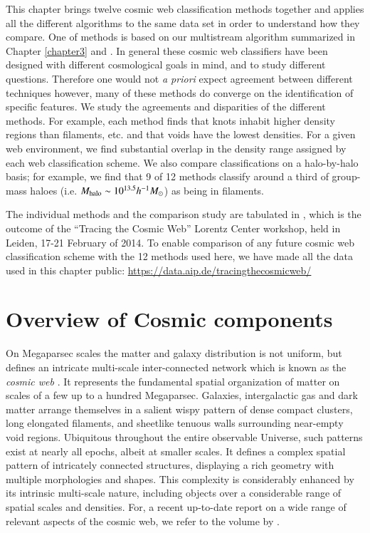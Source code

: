 This chapter brings twelve cosmic web classification methods together and applies all the different algorithms to the same data set in order to understand how they compare. One of methods is based on our multistream algorithm summarized in Chapter \ref{chapter3} and \cite{Ramachandra2015}. In general these cosmic web classifiers have been designed with different cosmological goals in mind, and to study different questions. Therefore one would not {\it a priori} expect agreement between different techniques however, many of these methods do converge on the identification of specific features. We study the agreements and disparities of the different methods. For example, each method finds that knots inhabit higher density regions than filaments, etc. and that voids have the lowest densities. For a given web environment, we find substantial overlap in the density range assigned by each web classification scheme. We also compare classifications on a halo-by-halo basis; for example, we find that 9 of 12 methods classify around a third of group-mass haloes (i.e. $M_{\rm halo}\sim10^{13.5}h^{-1}M_{\odot}$) as being in filaments. 

The individual methods and the comparison study are tabulated in \cite{Libeskind2018}, which is the outcome of the ``Tracing the Cosmic Web'' Lorentz Center workshop, held in Leiden, 17-21 February of 2014. To enable comparison of any future cosmic web classification scheme with the 12 methods used here, we have made all the data used in this chapter public: \url{https://data.aip.de/tracingthecosmicweb/}


\section{Overview of Cosmic components}
\label{section:intro}
On Megaparsec scales the matter and galaxy distribution is not uniform, but defines an intricate multi-scale inter-connected network 
which is known as the \emph{cosmic web} \citep{Bond1996}. It represents the fundamental spatial organization of 
matter on scales of a few up to a hundred Megaparsec. Galaxies, intergalactic gas and dark matter arrange themselves in a salient wispy 
pattern of dense compact clusters, long elongated filaments, and sheetlike tenuous walls surrounding near-empty void regions. Ubiquitous throughout  
the entire observable Universe, such patterns  exist at nearly all epochs, albeit at smaller scales. It defines a complex spatial 
pattern of intricately connected structures, displaying a rich geometry with multiple morphologies and shapes. This complexity is 
considerably enhanced by its intrinsic multi-scale nature, including objects over a considerable range of spatial scales and densities. 
For, a recent up-to-date report on a wide range of relevant aspects of the cosmic web, we refer to the volume by \cite{Iau308}.

